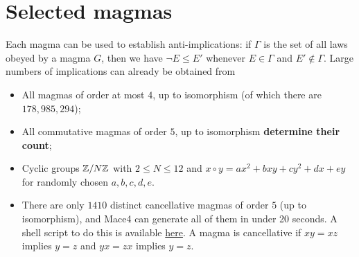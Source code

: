 \chapter{Selected magmas}\label{selected-magmas-chapter}

Each magma can be used to establish anti-implications: if $\Gamma$ is the set of all laws obeyed by a magma $G$, then we have $\neg E \leq E'$ whenever $E \in \Gamma$ and $E' \not \in \Gamma$.  Large numbers of implications can already be obtained from

\begin{itemize}
  \item All magmas of order at most $4$, up to isomorphism (of which there are $178,985,294$);
  \item All commutative magmas of order $5$, up to isomorphism {\bf determine their count};
  \item Cyclic groups $\mathbb{Z}/N\mathbb{Z}$ with $2 \leq N \leq 12$ and $x \circ y = ax^2+bxy+cy^2+dx+ey$ for randomly chosen $a,b,c,d,e$.
  \item There are only $1410$ distinct cancellative magmas of order $5$ (up to isomorphism), and Mace4 can generate all of them in under 20 seconds. A shell script to do this is available \href{https://github.com/zaklogician/equational_theories/tree/cancellative_magmas/scripts/cancellative_magmas}{here}. A magma is cancellative if $xy=xz$ implies $y=z$ and $yx=zx$ implies $y=z$.
\end{itemize}


